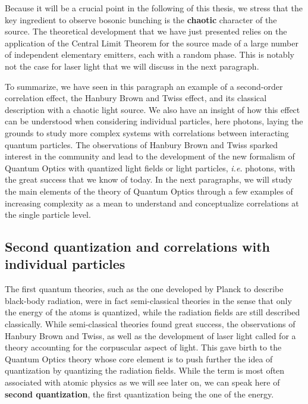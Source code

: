 Because it will be a crucial point in the following of this thesis, we stress that the key ingredient to observe bosonic bunching is the \textbf{chaotic} character of the source. The theoretical development that we have just presented relies on the application of the Central Limit Theorem for the source made of a large number of independent elementary emitters, each with a random phase. This is notably not the case for laser light that we will discuss in the next paragraph.


To summarize, we have seen in this paragraph an example of a second-order correlation effect, the Hanbury Brown and Twiss effect, and its classical description with a chaotic light source. We also have an insight of how this effect can be understood when considering individual particles, here photons, laying the grounds to study more complex systems with correlations between interacting quantum particles. The observations of Hanbury Brown and Twiss sparked interest in the community and lead to the development of the new formalism of Quantum Optics \cite{glauber1963quantum} with quantized light fields or light particles, {\it i.e.} photons, with the great success that we know of today. In the next paragraphs, we will study the main elements of the theory of Quantum Optics through a few examples of increasing complexity as a mean to understand and conceptualize correlations at the single particle level.

\subsection{Second quantization and correlations with individual particles}

The first quantum theories, such as the one developed by Planck to describe black-body radiation, were in fact semi-classical theories in the sense that only the energy of the atoms is quantized, while the radiation fields are still described classically. While semi-classical theories found great success, the observations of Hanbury Brown and Twiss, as well as the development of laser light called for a theory accounting for the corpuscular aspect of light. This gave birth to the Quantum Optics theory whose core element is to push further the idea of quantization by quantizing the radiation fields. While the term is most often associated with atomic physics as we will see later on, we can speak here of \textbf{second quantization}, the first quantization being the one of the energy.

